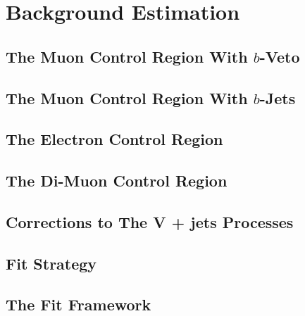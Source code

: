 \documentclass[10pt,twoside,cucitura,classica,english,openany]{toptesi}
\begin{document}
% 

\section{Background Estimation}
\label{sec:backgr-estim}



\subsection{The Muon Control Region With $b$-Veto}
\label{sec:muon-cr-bveto}



\subsection{The Muon Control Region With $b$-Jets}
\label{sec:muon-cr-bjet}



\subsection{The Electron Control Region}
\label{sec:ele-cr}



\subsection{The Di-Muon Control Region}
\label{sec:dimuon-cr}



\subsection{Corrections to The V + jets Processes}
\label{sec:corrections-vjets}



\subsection{Fit Strategy}
\label{sec:fit-strategy}



\subsection{The Fit Framework}
\label{sec:fit-framework}
\end{document}
